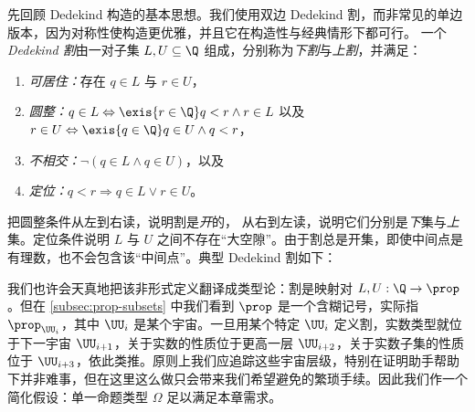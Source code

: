%
先回顾 Dedekind 构造的基本思想。我们使用双边 Dedekind 割，而非常见的单边版本，因为对称性使构造更优雅，并且它在构造性与经典情形下都可行。
%
一个\emph{Dedekind 割}由一对子集 $L, U \subseteq \Q$ 组成，分别称为\emph{下割}与\emph{上割}，并满足：
%
\begin{enumerate}
\item \emph{可居住：}存在 $q \in L$ 与 $r \in U$，
\item \emph{圆整：}$q \in L \Leftrightarrow \exis {r \in \Q} q < r \land r \in L$
  以及 $r \in U \Leftrightarrow \exis {q \in \Q} q \in U \land q < r$，
\item \emph{不相交：}$\lnot (q \in L \land q \in U)$，以及
\item \emph{定位：}$q < r \Rightarrow q \in L \lor r \in U$。
\end{enumerate}
%
把圆整条件从左到右读，说明割是\emph{开}的，
%
从右到左读，说明它们分别是\emph{下}集与\emph{上}集。定位条件说明 $L$ 与 $U$ 之间不存在“大空隙”。由于割总是开集，即使中间点是有理数，也不会包含该“中间点”。典型 Dedekind 割如下：
%
\begin{center}
\end{center}
%
我们也许会天真地把该非形式定义翻译成类型论：割是映射对 $L, U : \Q \to \prop$。但在 \cref{subsec:prop-subsets} 中我们看到 $\prop$ 是一个含糊记号，实际指 $\prop_{\UU_i}$，其中 $\UU_i$ 是某个宇宙。一旦用某个特定 $\UU_i$ 定义割，实数类型就位于下一宇宙 $\UU_{i+1}$，关于实数的性质位于更高一层 $\UU_{i+2}$，关于实数子集的性质位于 $\UU_{i+3}$，依此类推。原则上我们应追踪这些宇宙层级，特别在证明助手帮助下并非难事，但在这里这么做只会带来我们希望避免的繁琐手续。因此我们作一个简化假设：单一命题类型 $\Omega$ 足以满足本章需求。

